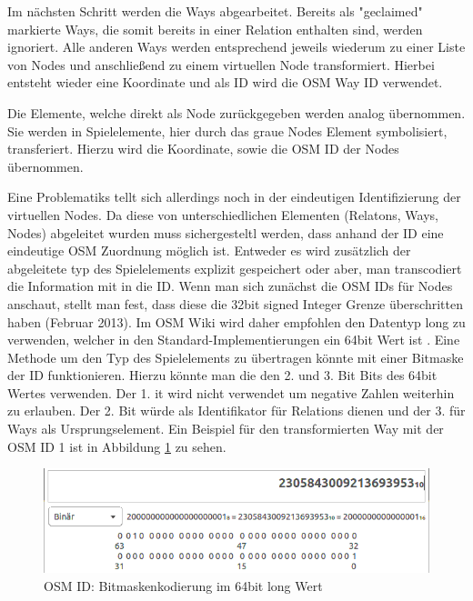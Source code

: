Im nächsten Schritt werden die Ways abgearbeitet. Bereits als "geclaimed" markierte Ways, die somit bereits in einer Relation enthalten sind, werden ignoriert. Alle anderen Ways werden entsprechend jeweils wiederum zu einer Liste von Nodes und anschließend zu einem virtuellen Node transformiert. Hierbei entsteht wieder eine Koordinate und als ID wird die OSM Way ID verwendet.

Die Elemente, welche direkt als Node zurückgegeben werden analog übernommen. Sie werden in Spielelemente, hier durch das graue Nodes Element symbolisiert, transferiert. Hierzu wird die Koordinate, sowie die OSM ID der Nodes übernommen.

Eine Problematiks tellt sich allerdings noch in der eindeutigen Identifizierung der virtuellen Nodes. Da diese von unterschiedlichen Elementen (Relatons, Ways, Nodes) abgeleitet wurden muss sichergesteltl werden, dass anhand der ID eine eindeutige OSM Zuordnung möglich ist.
Entweder es wird zusätzlich der abgeleitete typ des Spielelements explizit gespeichert oder aber, man transcodiert die Information mit in die ID.
Wenn man sich zunächst die OSM IDs für Nodes anschaut, stellt man fest, dass diese die 32bit signed Integer Grenze überschritten haben (Februar 2013). Im OSM Wiki wird daher empfohlen den Datentyp long zu verwenden, welcher in den Standard-Implementierungen ein 64bit Wert ist \cite{OSM.2013b}.
Eine Methode um den Typ des Spielelements zu übertragen könnte mit einer Bitmaske der ID funktionieren. Hierzu könnte man die den 2. und 3. Bit Bits des 64bit Wertes verwenden. Der 1. it wird nicht verwendet um negative Zahlen weiterhin zu erlauben. Der 2. Bit würde als Identifikator für Relations dienen und der 3. für Ways als Ursprungselement. Ein Beispiel für den transformierten Way mit der OSM ID 1 ist in Abbildung \ref{img:ch5_img03_bitmask} zu sehen.

\begin{figure}[H]
\begin{center}
\includegraphics[width=120mm]{images/ch5_img03_bitmask.png}
\caption{OSM ID: Bitmaskenkodierung im 64bit long Wert}
\label{img:ch5_img03_bitmask}
\end{center}
\end{figure}



